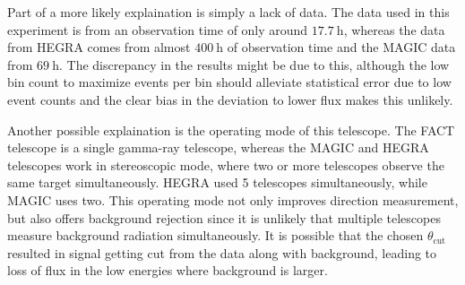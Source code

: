             Part of a more likely explaination is simply a lack of data.
            The data used in this experiment is from an observation time of only around $\SI{17.7}{\hour}$, whereas the data from HEGRA comes from almost $\SI{400}{\hour}$ of observation time and the MAGIC data from $\SI{69}{\hour}$.
            The discrepancy in the results might be due to this, although the low bin count to maximize events per bin should alleviate statistical error due to low event counts and the clear bias in the deviation to lower flux makes this unlikely.

            Another possible explaination is the operating mode of this telescope.
            The FACT telescope is a single gamma-ray telescope, whereas the MAGIC and HEGRA telescopes work in stereoscopic mode, where two or more telescopes observe the same target simultaneously.
            HEGRA used 5 telescopes simultaneously, while MAGIC uses two.
            This operating mode not only improves direction measurement, but also offers background rejection since it is unlikely that multiple telescopes measure background radiation simultaneously.
            It is possible that the chosen $\theta_\text{cut}$ resulted in signal getting cut from the data along with background, leading to loss of flux in the low energies where background is larger.
            

\newpage
\printbibliography
